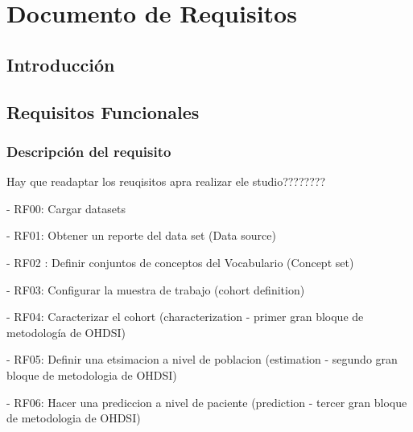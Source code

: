 \chapter{Documento de Requisitos}\label{cap:06requisitos}

\section{Introducción}






\section{Requisitos Funcionales}

\subsection{Descripción del requisito}

Hay que readaptar los reuqisitos apra realizar ele studio????????

- RF00: Cargar datasets

- RF01: Obtener un reporte del data set (Data source)

- RF02 : Definir conjuntos de conceptos del Vocabulario (Concept set)

- RF03: Configurar la muestra de trabajo (cohort definition)

- RF04: Caracterizar el cohort (characterization - primer gran bloque de metodología de OHDSI)

- RF05: Definir una etsimacion a nivel de poblacion (estimation - segundo gran bloque de metodologia de OHDSI)

- RF06: Hacer una prediccion a nivel de paciente (prediction - tercer gran bloque de metodologia de OHDSI)






